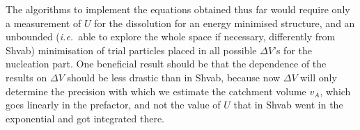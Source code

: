 \documentclass[12pt]{paper}    %
\newcommand{\ie}{\textit{i.e.}~}
\begin{document}
The algorithms to implement the equations obtained thus far would require only a measurement of $U$ for the dissolution for an energy minimised structure, and an unbounded (\ie able to explore the whole space if necessary, differently from Shvab) minimisation of trial particles placed in all possible $\Delta V$'s for the nucleation part. One beneficial result should be that the dependence of the results on $\Delta V$ should be less drastic than in Shvab, because now $\Delta V$ will only determine the precision with which we estimate the catchment volume $v_A$, which goes linearly in the prefactor, and not the value of $U$ that in Shvab went in the exponential and got integrated there.


%


%
%
%
%


%

%
\end{document}
